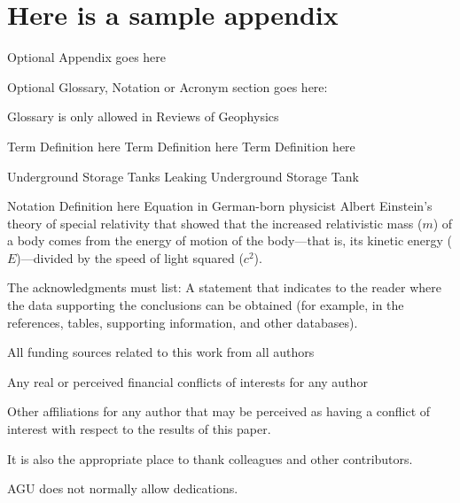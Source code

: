 \documentclass[draft,linenumbers]{agujournal2018}
\begin{document}
\appendix
\section{Here is a sample appendix}

Optional Appendix goes here

Optional Glossary, Notation or Acronym section goes here:

Glossary is only allowed in Reviews of Geophysics

\begin{glossary}
 Term Definition here
 Term Definition here
 Term Definition here
\end{glossary}

\begin{acronyms}
 Underground Storage Tanks
 Leaking Underground Storage Tank
\end{acronyms}

\begin{notation}
 Notation Definition here
Equation in German-born physicist Albert Einstein's theory of special
relativity that showed that the increased relativistic mass ($m$) of a
body comes from the energy of motion of the body—that is, its kinetic
energy ($E$)—divided by the speed of light squared ($c^2$).
\end{notation}

\acknowledgments

The acknowledgments must list: A statement that indicates to the reader
where the data supporting the conclusions can be obtained (for example,
in the references, tables, supporting information, and other databases).

All funding sources related to this work from all authors

Any real or perceived financial conflicts of interests for any author

Other affiliations for any author that may be perceived as having a
conflict of interest with respect to the results of this paper.

It is also the appropriate place to thank colleagues and other
contributors.

AGU does not normally allow dedications.


\end{document}
